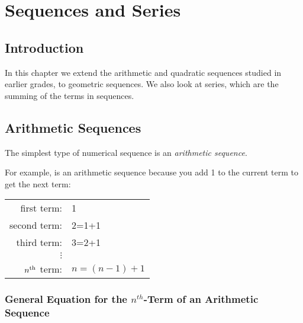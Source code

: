 \chapter{Sequences and Series}
\label{mp:s}

\section{Introduction}
In this chapter we extend the arithmetic and quadratic sequences studied in earlier grades, to geometric sequences. We also look at series, which are the summing of the terms in sequences.

\section{Arithmetic Sequences}
The simplest type of numerical sequence is an \textit{arithmetic sequence}. 


For example,
is an arithmetic sequence because you add 1 to the current term to get the next term:
\begin{center}
\begin{tabular}{rl}
first term:&1\\
second term:&2=1+1\\
third term:&3=2+1\\
$\vdots$&\\
$n^{\rm{th}}$ term:&$n=(n-1)+1$\\
\end{tabular}
\end{center}


\subsection{General Equation for the $n^{th}$-Term of an Arithmetic Sequence}

